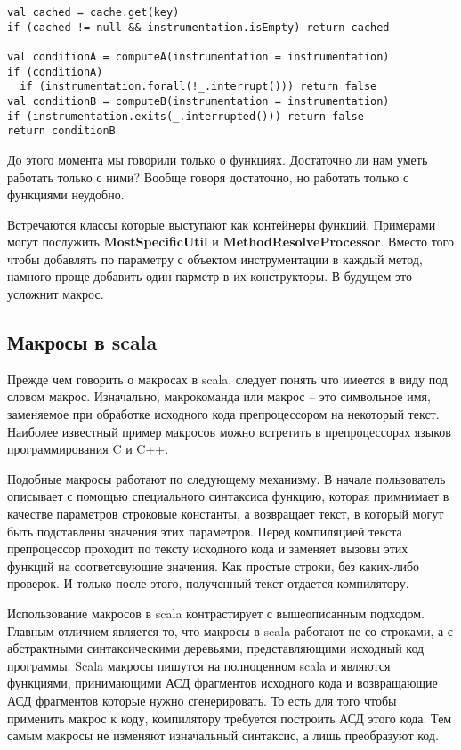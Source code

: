 \begin{lstlisting}[caption={Влияние на первоначальную логику},label=lst:cond]
val cached = cache.get(key)
if (cached != null && instrumentation.isEmpty) return cached

val conditionA = computeA(instrumentation = instrumentation)
if (conditionA)
  if (instrumentation.forall(!_.interrupt())) return false
val conditionB = computeB(instrumentation = instrumentation)
if (instrumentation.exits(_.interrupted())) return false
return conditionB
\end{lstlisting}

До этого момента мы говорили только о функциях.
Достаточно ли нам уметь работать только с ними?
Вообще говоря достаточно, но работать только с функциями неудобно.

Встречаются классы которые выступают как контейнеры функций.
Примерами могут послужить \textbf{MostSpecificUtil} и
\textbf{MethodResolveProcessor}.
Вместо того чтобы добавлять по параметру с объектом инструментации в каждый
метод, намного проще добавить один парметр в их конструкторы.
В будущем это усложнит макрос. %

\subsection{Макросы в scala}
\label{sec:macroScala}

Прежде чем говорить о макросах в scala, следует понять что имеется в виду под
словом макрос.
Изначально, макрокоманда или макрос -- это символьное имя,
заменяемое при обработке исходного кода препроцессором на некоторый текст.
Наиболее известный пример макросов можно встретить в препроцессорах языков
программирования C и C++.

Подобные макросы работают по следующему механизму.
В начале пользователь описывает с помощью специального синтаксиса функцию,
которая примнимает в качестве параметров строковые константы, а возвращает текст,
в который могут быть подставлены значения этих параметров.
Перед компиляцией текста препроцессор проходит по тексту исходного кода и заменяет
вызовы этих функций на соответсвующие значения.
Как простые строки, без каких-либо проверок.
И только после этого, полученный текст отдается компилятору.

Использование макросов в scala контрастирует с вышеописанным подходом.
Главным отличием является то, что макросы в scala работают не со строками,
а с абстрактными синтаксическими деревьями, представляющими исходный код
программы.
Scala макросы пишутся на полноценном scala и являются функциями, принимающими
АСД фрагментов исходного кода и возвращающие АСД фрагментов которые нужно
сгенерировать.
То есть для того чтобы применить макрос к коду, компилятору требуется построить
АСД этого кода. Тем самым макросы не изменяют изначальный синтаксис, а лишь
преобразуют код.

